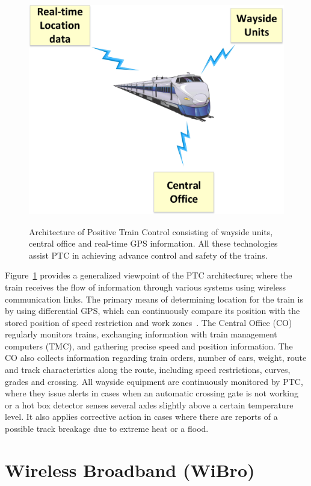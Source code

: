 \begin{figure}[!ht]
\centering
\includegraphics[width=\textwidth,height=10cm,keepaspectratio]{images/Gill/5G/ptc.eps} 
\caption{Architecture of Positive Train Control consisting of wayside units, central office and real-time GPS information. All these technologies assist PTC in achieving advance control and safety of the trains.}
\label{ptc}
\end{figure}


Figure~\ref{ptc} provides a generalized viewpoint of the PTC architecture; where the train receives the flow of information through various systems using wireless communication links. The primary means of determining location for the train is by using differential GPS, which can continuously compare its position with the stored position of speed restriction and work zones~\cite{5338992}. The Central Office (CO) regularly monitors trains, exchanging information with train management computers (TMC), and gathering precise speed and position information. The CO also collects information regarding train orders, number of cars, weight, route and track characteristics along the route, including speed restrictions, curves, grades and crossing. All wayside equipment are continuously monitored by PTC, where they issue alerts in cases when an automatic crossing gate is not working or a hot box detector senses several axles slightly above a certain temperature level. It also applies corrective action in cases where there are reports of a possible track breakage due to extreme heat or a flood.

\section{Wireless Broadband (WiBro)}

